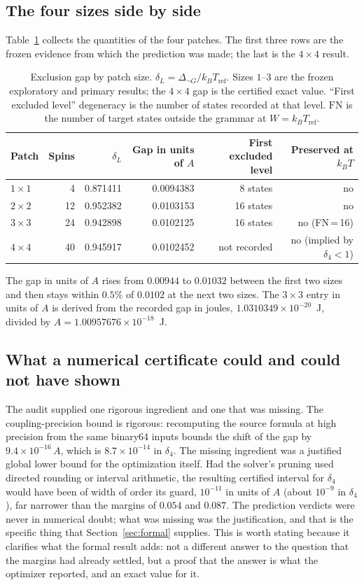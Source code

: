 \documentclass[11pt,a4paper]{article}
\theoremstyle{plain}
\theoremstyle{definition}
\theoremstyle{remark}
\newcommand{\dnG}{\Delta_{\neg G}}
\newcommand{\kBT}{k_{B}T}
\begin{document}
\subsection{The four sizes side by side}
Table~\ref{tab:sidebyside} collects the quantities of the four patches. The first three rows are the frozen evidence from which the prediction was made; the last is the $4\times4$ result.

\begin{table}[t]
\centering\small
\caption{Exclusion gap by patch size. $\delta_L=\dnG/\kBT_{\mathrm{ref}}$. Sizes $1$--$3$ are the frozen exploratory and primary results; the $4\times4$ gap is the certified exact value. ``First excluded level'' degeneracy is the number of states recorded at that level. $\mathrm{FN}$ is the number of target states outside the grammar at $W=\kBT_{\mathrm{ref}}$.}
\label{tab:sidebyside}
\begin{tabular}{@{}lrrrrr@{}}
\toprule
Patch & Spins & $\delta_L$ & Gap in units of $A$ & First excluded level & Preserved at $\kBT$\\
\midrule
$1\times1$ & 4 & 0.871411 & 0.0094383 & 8 states & no\\
$2\times2$ & 12 & 0.952382 & 0.0103153 & 16 states & no\\
$3\times3$ & 24 & 0.942898 & 0.0102125 & 16 states & no (FN\,=\,16)\\
$4\times4$ & 40 & 0.945917 & 0.0102452 & not recorded & no (implied by $\delta_4<1$)\\
\bottomrule
\end{tabular}
\end{table}

The gap in units of $A$ rises from $0.00944$ to $0.01032$ between the first two sizes and then stays within $0.5\%$ of $0.0102$ at the next two sizes. The $3\times3$ entry in units of $A$ is derived from the recorded gap in joules, $1.0310349\times10^{-20}$~J, divided by $A=1.00957676\times10^{-18}$~J.

\subsection{What a numerical certificate could and could not have shown}
The audit supplied one rigorous ingredient and one that was missing. The coupling-precision bound is rigorous: recomputing the source formula at high precision from the same binary64 inputs bounds the shift of the gap by $9.4\times10^{-16}\,A$, which is $8.7\times10^{-14}$ in $\delta_4$. The missing ingredient was a justified global lower bound for the optimization itself. Had the solver's pruning used directed rounding or interval arithmetic, the resulting certified interval for $\delta_4$ would have been of width of order its guard, $10^{-11}$ in units of $A$ (about $10^{-9}$ in $\delta_4$), far narrower than the margins of $0.054$ and $0.087$. The prediction verdicts were never in numerical doubt; what was missing was the justification, and that is the specific thing that Section~\ref{sec:formal} supplies. This is worth stating because it clarifies what the formal result adds: not a different answer to the question that the margins had already settled, but a proof that the answer is what the optimizer reported, and an exact value for it.
\end{document}
